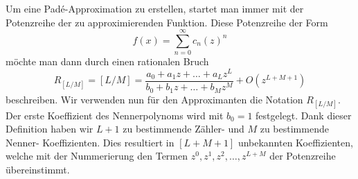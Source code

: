 Um eine Padé-Approximation zu erstellen, startet man immer mit der Potenzreihe der zu approximierenden Funktion.
Diese Potenzreihe der Form 
\begin{equation}
f(x)=\sum_{n=0}^{\infty} c_{n} (z)^{n} 
\end{equation} 
möchte man dann durch einen rationalen Bruch 
\begin{equation}
R_{[L/M]}
=
[L/M]
=
\frac{a_0 + a_1 z + \dots + a_L z^L}{b_0 + b_1 z + \dots + b_M z^M}
+O(z^{L+M+1})
\end{equation}
beschreiben.
Wir verwenden nun für den Approximanten die Notation $R_{[L/M]}$.
Der erste Koeffizient des Nennerpolynoms wird mit $b_0 = 1$ festgelegt.
Dank dieser Definition haben wir $L+1$ zu bestimmende Zähler- und $M$ zu bestimmende Nenner- Koeffizienten. 
Dies resultiert in $[L+M+1]$ unbekannten Koeffizienten, welche mit der Nummerierung den Termen $z^0, z^1, z^2,\dots , z^{L+M}$ der Potenzreihe übereinstimmt.

